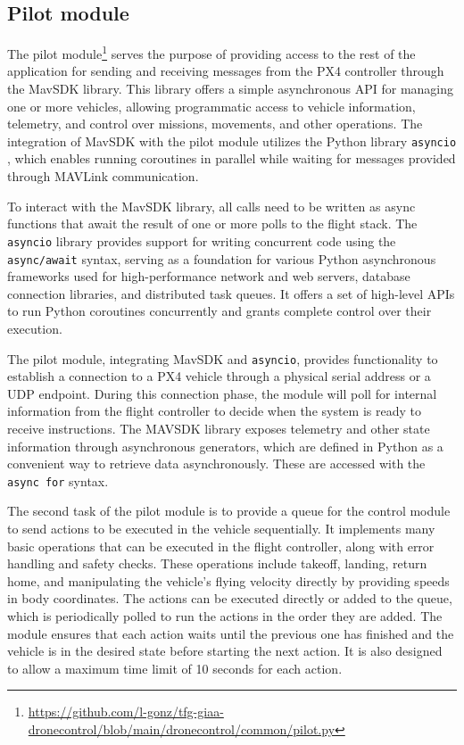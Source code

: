 \subsection{Pilot module}
\label{subsec:pilot-module}

The pilot module\footnote{\url{https://github.com/l-gonz/tfg-giaa-dronecontrol/blob/main/dronecontrol/common/pilot.py}} serves the purpose of providing access to the rest of the application for sending and receiving messages from the PX4 controller through the MavSDK library. This library offers a simple asynchronous API for managing one or more vehicles, allowing programmatic access to vehicle information, telemetry, and control over missions, movements, and other operations. The integration of MavSDK with the pilot module utilizes the Python library \texttt{asyncio} \cite{asyncio}, which enables running coroutines in parallel while waiting for messages provided through MAVLink communication.

To interact with the MavSDK library, all calls need to be written as async functions that await the result of one or more polls to the flight stack. The \texttt{asyncio} library provides support for writing concurrent code using the \texttt{async/await} syntax, serving as a foundation for various Python asynchronous frameworks used for high-performance network and web servers, database connection libraries, and distributed task queues. It offers a set of high-level APIs to run Python coroutines concurrently and grants complete control over their execution.

The pilot module, integrating MavSDK and \texttt{asyncio}, provides functionality to establish a connection to a PX4 vehicle through a physical serial address or a UDP endpoint.
During this connection phase, the module will poll for internal information from the flight controller to decide when the system is ready to receive instructions.
The MAVSDK library exposes telemetry and other state information through asynchronous generators, which are defined in Python as a convenient way to retrieve data asynchronously. These are accessed with the \texttt{async\ for} syntax.

The second task of the pilot module is to provide a queue for the control module to send actions to be executed in the vehicle sequentially. It implements many basic operations that can be executed in the flight controller, along with error handling and safety checks. These operations include takeoff, landing, return home, and manipulating the vehicle's flying velocity directly by providing speeds in body coordinates. The actions can be executed directly or added to the queue, which is periodically polled to run the actions in the order they are added. The module ensures that each action waits until the previous one has finished and the vehicle is in the desired state before starting the next action.
It is also designed to allow a maximum time limit of 10 seconds for each action.

